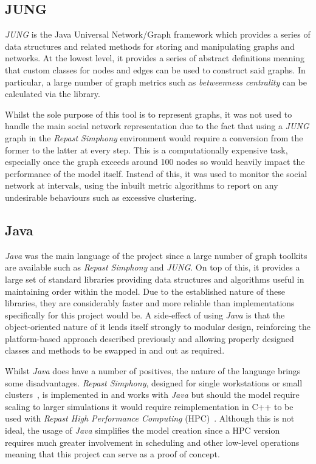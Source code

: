 \documentclass[]{report}
\begin{document}
\subsection{JUNG}
\emph{JUNG} is the Java Universal Network/Graph framework which provides a series of data structures and related methods for storing and manipulating graphs and networks. At the lowest level, it provides a series of abstract definitions meaning that custom classes for nodes and edges can be used to construct said graphs. In particular, a large number of graph metrics such as \emph{betweenness centrality} can be calculated via the library.

Whilst the sole purpose of this tool is to represent graphs, it was not used to handle the main social network representation due to the fact that using a \emph{JUNG} graph in the \emph{Repast Simphony} environment would require a conversion from the former to the latter at every step. This is a computationally expensive task, especially once the graph exceeds around 100 nodes so would heavily impact the performance of the model itself. Instead of this, it was used to monitor the social network at intervals, using the inbuilt metric algorithms to report on any undesirable behaviours such as excessive clustering.

\subsection{Java}
\emph{Java} was the main language of the project since a large number of graph toolkits are available such as \emph{Repast Simphony} and \emph{JUNG}. On top of this, it provides a large set of standard libraries providing data structures and algorithms useful in maintaining order within the model. Due to the established nature of these libraries, they are considerably faster and more reliable than implementations specifically for this project would be. A side-effect of using \emph{Java} is that the object-oriented nature of it lends itself strongly to modular design, reinforcing the platform-based approach described previously and allowing properly designed classes and methods to be swapped in and out as required.

Whilst \emph{Java} does have a number of positives, the nature of the language brings some disadvantages. \emph{Repast Simphony}, designed for single workstations or small clusters~\cite{repast-simp}, is implemented in and works with \emph{Java} but should the model require scaling to larger simulations it would require reimplementation in C++ to be used with \emph{Repast High Performance Computing} (HPC)~\cite{repast-HPC}. Although this is not ideal, the usage of \emph{Java} simplifies the model creation since a HPC version requires much greater involvement in scheduling and other low-level operations meaning that this project can serve as a proof of concept.
\end{document}
